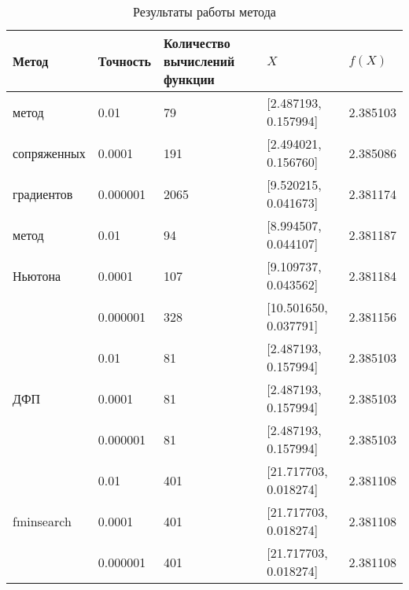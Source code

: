 \begin{table}[!ht]
\caption{Результаты работы метода}
\begin{tabular}{|p{}|p{}|p{}|p{}|p{}|}
\hline
Метод & Точность& Количество вычислений функции & $X$ & $f(X)$\\
\hline
метод & 0.01 & 79 & [2.487193, 0.157994] & 2.385103 \\
сопряженных & 0.0001 & 191 & [2.494021, 0.156760] & 2.385086\\
градиентов & 0.000001 & 2065 & [9.520215, 0.041673] & 2.381174 \\
\hline
метод & 0.01 & 94 & [8.994507, 0.044107] & 2.381187\\
Ньютона & 0.0001 & 107 & [9.109737, 0.043562] & 2.381184\\
 & 0.000001 & 328 & [10.501650, 0.037791] & 2.381156 \\
\hline
& 0.01 & 81 & [2.487193, 0.157994] & 2.385103\\
ДФП& 0.0001 & 81 & [2.487193, 0.157994] & 2.385103\\
& 0.000001 & 81 & [2.487193, 0.157994] & 2.385103 \\
\hline
& 0.01 & 401 & [21.717703, 0.018274] & 2.381108 \\
fminsearch& 0.0001 & 401 & [21.717703, 0.018274] & 2.381108 \\
& 0.000001 & 401 & [21.717703, 0.018274] & 2.381108 \\
\hline
\end{tabular}
\label{tb:tab23}
\end{table}


%
%

